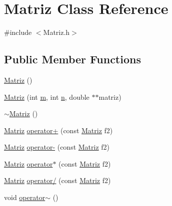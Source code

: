 \hypertarget{class_matriz}{\section{Matriz Class Reference}
\label{class_matriz}
}


{\ttfamily \#include $<$Matriz.\+h$>$}

\subsection*{Public Member Functions}
\begin{DoxyCompactItemize}
\item 
\hyperlink{class_matriz_a7de756301bddbc4b0b5d2a0f2b1fc695}{Matriz} ()
\item 
\hyperlink{class_matriz_a8a4293f800d43826bd4eaab58317613a}{Matriz} (int \hyperlink{class_matriz_a7141f8b75ce8aa34bded24988fd30998}{m}, int \hyperlink{class_matriz_a3b5041f8eaee4aa3ef646378f0dd2d6d}{n}, double $\ast$$\ast$matriz)
\item 
\hyperlink{class_matriz_a2092b7a289ecec369e1da407d5839f5a}{$\sim$\+Matriz} ()
\item 
\hyperlink{class_matriz}{Matriz} \hyperlink{class_matriz_ac31eefc8b92f8c69dcedf44bd95e419a}{operator+} (const \hyperlink{class_matriz}{Matriz} f2)
\item 
\hyperlink{class_matriz}{Matriz} \hyperlink{class_matriz_a51f5b360494aca1f85432aa785feae3f}{operator-\/} (const \hyperlink{class_matriz}{Matriz} f2)
\item 
\hyperlink{class_matriz}{Matriz} \hyperlink{class_matriz_a41687d45c1c335cf7fab72fbebdfb518}{operator$\ast$} (const \hyperlink{class_matriz}{Matriz} f2)
\item 
\hyperlink{class_matriz}{Matriz} \hyperlink{class_matriz_a308ec6bc46d21ca9695d9cd7c5c0d5a7}{operator/} (const \hyperlink{class_matriz}{Matriz} f2)
\item 
void \hyperlink{class_matriz_a7eb9064958c359ce2f6b6ab0327b1282}{operator$\sim$} ()
\end{DoxyCompactItemize}
